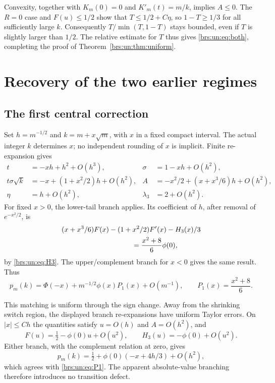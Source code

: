 \documentclass[11pt]{article}
\numberwithin{equation}{section}
\theoremstyle{remark}\newtheorem{remark}[theorem]{Remark}
\begin{document}
Convexity, together with $K_m(0)=0$ and $K'_m(t)=m/k$, implies
$A\le0$.  The $R=0$ case and $F(u)\le1/2$ show that
$T\le1/2+C\eta$, so $1-T\ge1/3$ for all sufficiently large $k$.
Consequently $T/\min(T,1-T)$ stays bounded, even if $T$ is slightly
larger than $1/2$.  The relative estimate for $T$ thus gives
\eqref{brs:un:eq:both}, completing the proof of
Theorem~\ref{brs:un:thm:uniform}.

\section{Recovery of the two earlier regimes}\label{brs:un:sec:matching}

\subsection{The first central correction}

Set $h=m^{-1/2}$ and $k=m+x\sqrt m$, with $x$ in a fixed compact
interval.  The actual integer $k$ determines $x$; no independent
rounding of $x$ is implicit.  Finite re-expansion gives
\begin{align}\label{brs:un:eq:centralexp}
 t&=-xh+h^2+O(h^3),& \sigma&=1-xh+O(h^2),\\
 t\sigma\sqrt k&=-x+(1+x^2/2)h+O(h^2),&
 A&=-x^2/2+(x+x^3/6)h+O(h^2),\nonumber\\
 \eta&=h+O(h^2),&\lambda_3&=2+O(h^2).\nonumber
\end{align}
For fixed $x>0$, the lower-tail branch applies.  Its coefficient of
$h$, after removal of $e^{-x^2/2}$, is
\begin{align*}
 &(x+x^3/6)F(x)-(1+x^2/2)F'(x)-H_3(x)/3\\
 &\hspace{35mm}=\frac{x^2+8}{6}\phi(0),
\end{align*}
by \eqref{brs:un:eq:H3}.  The upper/complement branch for $x<0$ gives the
same result.  Thus
\begin{equation}\label{brs:un:eq:P1}
 p_m(k)=\Phi(-x)+m^{-1/2}\phi(x)P_1(x)+O(m^{-1}),
 \qquad P_1(x)=\frac{x^2+8}{6}.
\end{equation}

This matching is uniform through the sign change.  Away from the
shrinking switch region, the displayed branch re-expansions have
uniform Taylor errors.  On $|x|\le Ch$ the quantities satisfy
$u=O(h)$ and $A=O(h^2)$, and
\[
 F(u)=\tfrac12-\phi(0)u+O(u^2),\qquad
 H_3(u)=-\phi(0)+O(u^2).
\]
Either branch, with the complement relation at zero, gives
\[
 p_m(k)=\tfrac12+\phi(0)(-x+4h/3)+O(h^2),
\]
which agrees with \eqref{brs:un:eq:P1}.  The apparent absolute-value branching
therefore introduces no transition defect.
\end{document}
